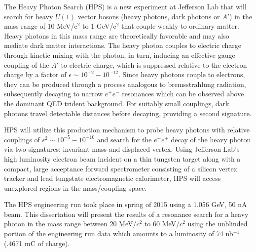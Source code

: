 The Heavy Photon Search (HPS) is a new experiment at Jefferson Lab that will 
search for heavy $U(1)$ vector bosons (heavy photons, dark photons or $A'$)
in the mass range of 10 MeV/c$^{2}$ to 1 GeV/c$^{2}$ that couple weakly to
ordinary matter.  Heavy photons in this mass range are theoretically favorable
and may also mediate dark matter interactions.  The heavy photon couples to 
electric charge through kinetic mixing with the photon, in turn, inducing an 
effective gauge coupling of the $A'$ to electric charge, which is suppressed
relative to the electron charge by a factor of 
$\epsilon \sim 10^{-2} - 10^{-12}$.  Since heavy photons couple to electrons, 
they can be produced through a process analogous to bremsstrahlung radiation, 
subsequently decaying to narrow $e^{+}e^{-}$ resonances which can be observed 
above the dominant QED trident background.  For suitably small couplings, dark
photons travel detectable distances before decaying, providing a second 
signature.

HPS will utilize this production mechanism to probe heavy photons with relative 
couplings of $\epsilon^2 \sim 10^{-5} - 10^{-10}$ and search for the 
$e^{-}e^{+}$ decay of the
heavy photon via two signatures: invariant mass and displaced vertex.  Using 
Jefferson Lab’s high luminosity electron beam incident on a thin tungsten target along with a compact, large 
acceptance forward spectrometer consisting of a silicon vertex tracker and lead
tungstate electromagnetic calorimeter, HPS will access unexplored regions in the
mass/coupling space. 

The HPS engineering run took place in spring of 2015 using a 1.056 GeV, 50 nA 
beam.  This dissertation will present the results of a resonance search for a heavy
photon in the mass range between 20 MeV/$c^2$ to 60 MeV/$c^2$ using the unblinded
portion of the engineering run data which amounts to a luminosity of 74 nb$^{-1}$
(.4671 mC of charge).
